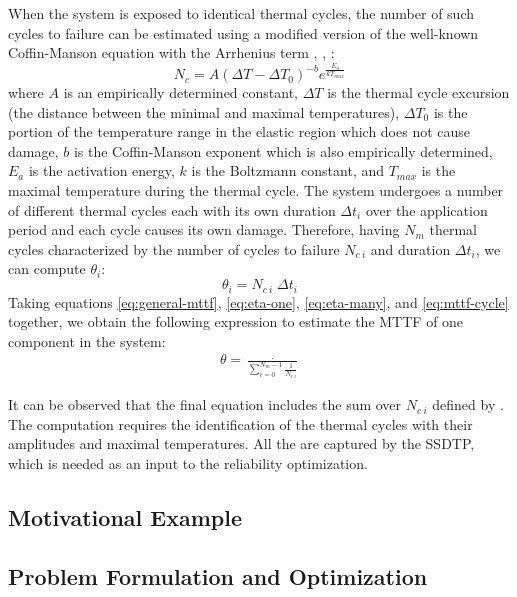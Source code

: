 When the system is exposed to identical thermal cycles, the number of such cycles to failure can be estimated using a modified version of the well-known Coffin-Manson equation with the Arrhenius term \cite{xiang2010}, \cite{jedec2010}, \cite{ciappa2003}:
\begin{equation} \label{eq:cycles-to-failure}
  N_c = A (\Delta T - \Delta T_0)^{-b} e^{\frac{E_a}{k T_{max}}}
\end{equation}
where $A$ is an empirically determined constant, $\Delta T$ is the thermal cycle excursion (the distance between the minimal and maximal temperatures), $\Delta T_0$ is the portion of the temperature range in the elastic region which does not cause damage, $b$ is the Coffin-Manson exponent which is also empirically determined, $E_{a}$ is the activation energy, $k$ is the Boltzmann constant, and $T_{max}$ is the maximal temperature during the thermal cycle. The system undergoes a number of different thermal cycles each with its own duration $\Delta t_i$ over the application period and each cycle causes its own damage. Therefore, having $N_m$ thermal cycles characterized by the number of cycles to failure $N_{c\:i}$ and duration $\Delta t_i$, we can compute $\theta_i$:
\begin{equation} \label{eq:mttf-cycle}
  \theta_i = N_{c \: i} \; \Delta t_i
\end{equation}
Taking equations \eqref{eq:general-mttf}, \eqref{eq:eta-one}, \eqref{eq:eta-many}, and \eqref{eq:mttf-cycle} together, we obtain the following expression to estimate the MTTF of one component in the system:
\begin{align} \label{eq:one-mttf}
  \theta = \frac{\period}{\sum_{i=0}^{N_m - 1} \frac{1}{N_{c \: i}}}
\end{align}

It can be observed that the final equation includes the sum over $N_{c \: i}$ defined by . The computation requires the identification of the thermal cycles with their amplitudes and maximal temperatures. All the  are captured by the SSDTP, which is needed as an input to the reliability optimization.

\subsection{Motivational Example} \label{sec:motivation}


\subsection{Problem Formulation and Optimization} \label{sec:reliability-problem}

